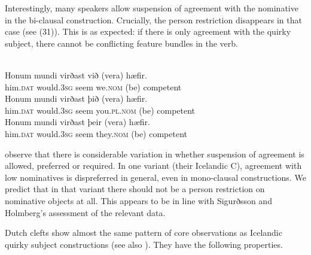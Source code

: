 \documentclass[output=paper]{langsci/langscibook}
\begin{document}
\ea \label{bkm:Ref295483138} 
\z
\z

Interestingly, many speakers allow suspension of agreement with the nominative in the bi-clausal construction. Crucially, the person restriction disappears in that case (see (31)). This is as expected: if there is only agreement with the quirky subject, there cannot be conflicting feature bundles in the verb.

\ea \label{bkm:Ref295483205} \citep{Sigurðsson2008}\\
 \ea \gll  Honum  mundi        virðast við         (vera) hæfir.\\
 him.\textsc{dat} would.\textsc{3sg} seem    we.\textsc{nom} (be)    competent   \\
  \ex \gll  Honum  mundi       virðast þið               (vera) hæfir.\\
  him.\textsc{dat} would.\textsc{3sg} seem   you.\textsc{pl.nom} (be)    competent\\
  \ex \gll  Honum  mundi       virðast þeir          (vera) hæfir.\\
  him.\textsc{dat} would.\textsc{3sg} seem   they.\textsc{nom} (be)    competent\\
\z
\z

\citet{Sigurðsson2008} observe that there is considerable variation in whether suspension of agreement is allowed, preferred or required. In one variant (their Icelandic C), agreement with low nominatives is dispreferred in general, even in mono-clausal constructions. We predict that in that variant there should not be a person restriction on nominative objects at all. This appears to be in line with Sigurðsson and Holmberg’s assessment of the relevant data.

Dutch clefts show almost the same pattern of core observations as Icelandic quirky subject constructions (see also \citealt{Dikken2014}). They have the following properties. 
\end{document}
